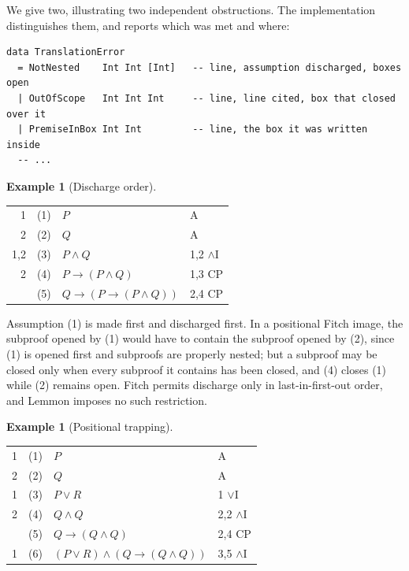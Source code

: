 \documentclass[11pt]{article}
\makeatletter
\theoremstyle{plain}
\theoremstyle{definition}
\newtheorem{example}[theorem]{Example}
\theoremstyle{remark}
\newcommand{\dep}[1]{\textup{#1}}
\newenvironment{lemmonproof}
  {\begin{center}\begin{tabular}{@{}r@{\hspace{1.5em}}r@{\hspace{0.6em}}l@{\hspace{2.5em}}l@{}}}
  {\end{tabular}\end{center}}
\makeatother
\begin{document}
We give two, illustrating two independent obstructions. The implementation
distinguishes them, and reports which was met and where:

\begin{lstlisting}
data TranslationError
  = NotNested    Int Int [Int]   -- line, assumption discharged, boxes open
  | OutOfScope   Int Int Int     -- line, line cited, box that closed over it
  | PremiseInBox Int Int         -- line, the box it was written inside
  -- ...
\end{lstlisting}

\begin{example}[Discharge order]\label{ex:order}
\begin{lemmonproof}
\dep{1}   & (1) & $P$                        & A \\
\dep{2}   & (2) & $Q$                        & A \\
\dep{1,2} & (3) & $P \wedge Q$               & 1,2 $\wedge$I \\
\dep{2}   & (4) & $P \to (P \wedge Q)$       & 1,3 CP \\
          & (5) & $Q \to (P \to (P \wedge Q))$ & 2,4 CP \\
\end{lemmonproof}
\end{example}

\noindent Assumption (1) is made first and discharged first. In a positional
Fitch image, the subproof opened by (1) would have to contain the subproof
opened by (2), since (1) is opened first and subproofs are properly nested;
but a subproof may be closed only when every subproof it contains has been
closed, and (4) closes (1) while (2) remains open. Fitch permits discharge
only in last-in-first-out order, and Lemmon imposes no such restriction.

\begin{example}[Positional trapping]\label{ex:trap}
\begin{lemmonproof}
\dep{1} & (1) & $P$                                     & A \\
\dep{2} & (2) & $Q$                                     & A \\
\dep{1} & (3) & $P \vee R$                              & 1 $\vee$I \\
\dep{2} & (4) & $Q \wedge Q$                            & 2,2 $\wedge$I \\
        & (5) & $Q \to (Q \wedge Q)$                    & 2,4 CP \\
\dep{1} & (6) & $(P \vee R) \wedge (Q \to (Q \wedge Q))$ & 3,5 $\wedge$I \\
\end{lemmonproof}
\end{example}
\end{document}
